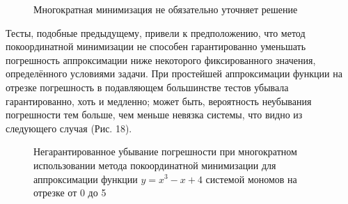 ﻿\documentclass[a4paper, 12pt]{article}
\begin{document}
\begin{figure}[h!]
    \noindent{}
   \caption{Многократная минимизация не обязательно уточняет решение}
    \label{figCurves}
\end{figure}

Тесты, подобные предыдущему, привели к предположению, что метод покоординатной минимизации не способен гарантированно уменьшать погрешность аппроксимации ниже некоторого фиксированного значения, определённого условиями задачи. При простейшей аппроксимации функции на отрезке погрешность в подавляющем большинстве тестов убывала гарантированно, хоть и медленно; может быть, вероятность неубывания погрешности тем больше, чем меньше невязка системы, что видно из следующего случая (Рис. 18). 

\begin{figure}[h!]
    \noindent{}
   \caption{Негарантированное убывание погрешности при многократном использовании метода покоординатной минимизации для аппроксимации функции $y=x^3-x+4$ системой мономов на отрезке от 0 до 5}
    \label{figCurves}
\end{figure}
\end{document}

